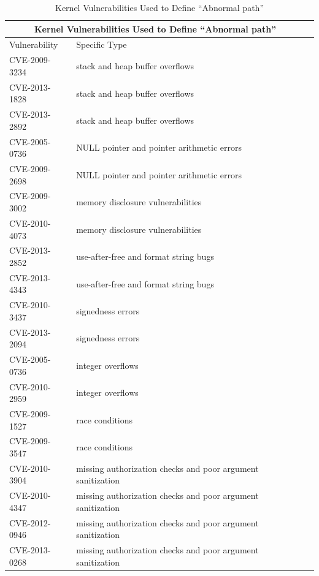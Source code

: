 \begin{table}[t]
\begin{tabular*}{\textwidth}{l @{\extracolsep{\fill}} lc}
\toprule
\multicolumn{2}{c}{Kernel Vulnerabilities Used to Define ``Abnormal path''} \\

\midrule
Vulnerability    &  Specific Type \\
\midrule
 CVE-2009-3234 \cite{CVE:20093234} & stack and heap buffer overflows \\
 CVE-2013-1828 \cite{CVE:20131828} & stack and heap buffer overflows \\
 CVE-2013-2892 \cite{CVE:20132892} & stack and heap buffer overflows \\
 CVE-2005-0736 \cite{CVE:20050736} & NULL pointer and pointer arithmetic errors \\
 CVE-2009-2698 \cite{CVE:20092698} & NULL pointer and pointer arithmetic errors \\
 CVE-2009-3002 \cite{CVE:20093002} &  memory disclosure vulnerabilities \\
 CVE-2010-4073 \cite{CVE:20104073} &  memory disclosure vulnerabilities \\
 CVE-2013-2852 \cite{CVE:20132852} &  use-after-free and format string bugs \\
 CVE-2013-4343 \cite{CVE:20134343} &  use-after-free and format string bugs \\
 CVE-2010-3437 \cite{CVE:20103437} &  signedness errors \\
 CVE-2013-2094 \cite{CVE:20132094} &  signedness errors \\
 CVE-2005-0736 \cite{CVE:20050736} &  integer overflows \\
 CVE-2010-2959 \cite{CVE:20102959} &  integer overflows \\
 CVE-2009-1527 \cite{CVE:20091527} &  race conditions \\
 CVE-2009-3547 \cite{CVE:20093547} &  race conditions \\
 CVE-2010-3904 \cite{CVE:20103904} &  missing authorization checks and poor argument sanitization\\
 CVE-2010-4347 \cite{CVE:20104347} &  missing authorization checks and poor argument sanitization\\
 CVE-2012-0946 \cite{CVE:20120946} &  missing authorization checks and poor argument sanitization\\
 CVE-2013-0268 \cite{CVE:20130268} &  missing authorization checks and poor argument sanitization\\

\bottomrule
\end{tabular*}
\caption {Kernel Vulnerabilities Used to Define ``Abnormal path''}
\label{table:abnormal_path}
\end{table}


